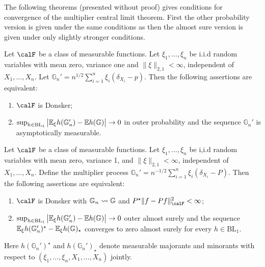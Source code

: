 The following theorems (presented without proof) gives conditions for convergence of the multiplier central limit theorem. First the other probability version is given under the same conditions as  then the almost sure version is given under only slightly stronger conditions. 

\begin{theorem}
	\label{thm:conditional-multiplier-clt-probability}
	Let \(\calF\) be a class of measurable functions. Let \(\xi_1,\dots,\xi_n\) be i.i.d random variables with mean zero, variance one and \(\|\xi\|_{2,1}<\infty\), independent of \(X_1,\dots,X_n\). Let \(\mathbb{G}_n'=n^{1/2}\sum_{i=1}^n \xi_i\left(\delta_{X_i}-p\right)\). Then the following assertions are equivalent:
	\begin{enumerate}
		\item \(\calF\) is Donsker;
		\item  \(\sup_{h\in\text{BL}_1}\left|\mathbb{E}_\xi h(\mathbb{G}_n')-\mathbb{E} h(\mathbb{G})\right|\to 0\) in outer probability and the sequence \(\mathbb{G}_n'\) is asymptotically measurable.
	\end{enumerate}
\end{theorem}

\begin{theorem}
	\label{thm:conditional-multiplier-clt}
	Let \(\calF\) be a class of measurable functions. Let \(\xi_1,\dots,\xi_n\) be i,i.d random variables with mean zero, variance 1, and \(\|\xi\|_{2,1}<\infty\), independent of \(X_1,\dots,X_n\). Define the multiplier process \(\mathbb{G}_n'=n^{-1/2}\sum_{i=1}^n \xi_i(\delta_{X_i}-P)\). Then the following assertions are equivalent:
	\begin{enumerate}
		\item \(\calF\) is Donsker with \(\mathbb{G}_n\rightsquigarrow\mathbb{G}\) and \(P^\star\|f-Pf\|_\calF^2<\infty\);
		\item \(\sup_{h\in\text{BL}_1}\left|\mathbb{E}_\xi h(\mathbb{G}_n')-\mathbb{E} h(\mathbb{G})\right|\to 0\) outer almost surely and the sequence \(\mathbb{E}_\xi h(\mathbb{G}_n')^\star - \mathbb{E}_\xi h(\mathbb{G})_\star\) converges to zero almost surely for every \(h\in \text{BL}_1\). 
	\end{enumerate}
	Here \(h(\mathbb{G}_n')^\star\) and \(h(\mathbb{G}_n')_\star\) denote measurable majorants and minorants with respect to \(\left(\xi_1,\dots,\xi_n,X_1,\dots,X_n\right)\) jointly.
\end{theorem}


